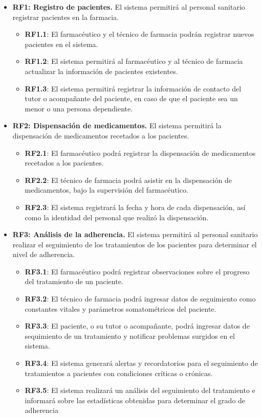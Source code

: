 \begin{itemize}
	\item \textbf{RF1: Registro de pacientes.} El sistema permitirá al personal sanitario registrar pacientes en la farmacia.
	
	\begin{itemize}
		 
		\item \textbf{RF1.1}: El farmacéutico y el técnico de farmacia podrán registrar nuevos pacientes en el sistema.
		\item \textbf{RF1.2}: El sistema permitirá al farmacéutico y al técnico de farmacia actualizar la información de pacientes existentes.
		\item \textbf{RF1.3}: El sistema permitirá registrar la información de contacto del tutor o acompañante del paciente, en caso de que el paciente sea un menor o una persona dependiente.
	\end{itemize}

	\item \textbf{RF2: Dispensación de medicamentos.} El sistema permitirá la dispensación de medicamentos recetados a los pacientes.
	
	\begin{itemize}
		\item \textbf{RF2.1}: El farmacéutico podrá registrar la dispensación de medicamentos recetados a los pacientes.
		\item \textbf{RF2.2}: El técnico de farmacia podrá asistir en la dispensación de medicamentos, bajo la supervisión del farmacéutico.
		\item \textbf{RF2.3}: El sistema registrará la fecha y hora de cada dispensación, así como la identidad del personal que realizó la dispensación.
	\end{itemize}
	
	\item \textbf{RF3: Análisis de la adherencia.} El sistema permitirá al personal sanitario realizar el seguimiento de los tratamientos de los pacientes para determinar el nivel de adherencia.
	
	\begin{itemize}
		\item \textbf{RF3.1}: El farmacéutico podrá registrar observaciones sobre el progreso del tratamiento de un paciente.
		\item \textbf{RF3.2}: El técnico de farmacia podrá ingresar datos de seguimiento como constantes vitales y parámetros somatométricos del paciente.
		\item \textbf{RF3.3}: El paciente, o su tutor o acompañante, podrá ingresar datos de sequimiento de un tratamiento y notificar problemas surgidos en el sistema.
		\item \textbf{RF3.4}: El sistema generará alertas y recordatorios para el seguimiento de tratamientos a pacientes con condiciones críticas o crónicas.
		\item \textbf{RF3.5}: El sistema realizará un análisis del seguimiento del tratamiento e informará sobre las estadísticas obtenidas para determinar el grado de adherencia 
	\end{itemize}
	

\end{itemize}
